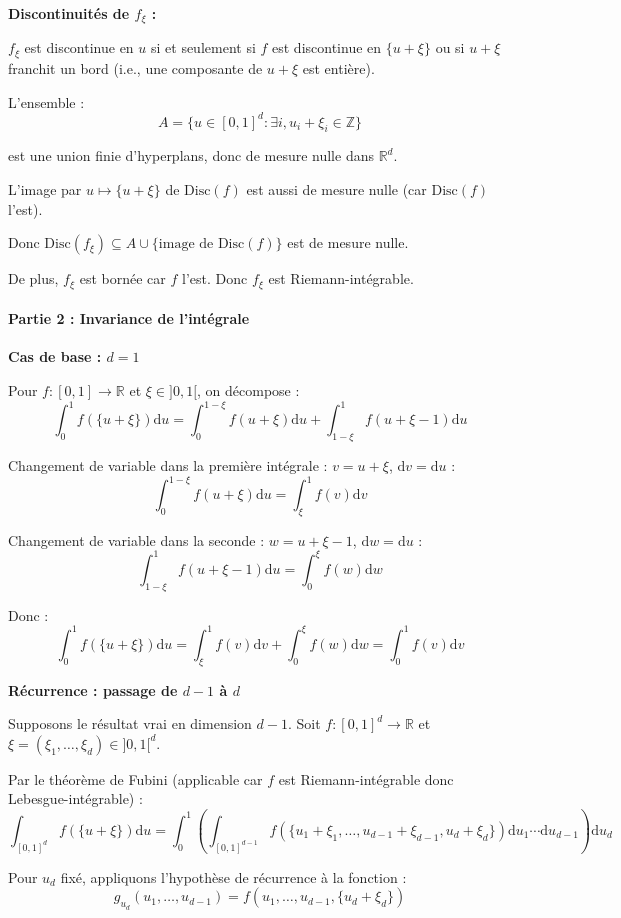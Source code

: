 \documentclass[12pt,a4paper]{article}
\theoremstyle{definition}
\theoremstyle{remark}
\newcommand{\R}{\mathbb{R}}
\newcommand{\dd}{\mathrm{d}}
\begin{document}
\textbf{Discontinuités de $f_\xi$ :}

$f_\xi$ est discontinue en $u$ si et seulement si $f$ est discontinue en $\{u + \xi\}$ ou si $u + \xi$ franchit un bord (i.e., une composante de $u + \xi$ est entière).

L'ensemble :
\[
A = \{u \in [0,1]^d : \exists i, u_i + \xi_i \in \mathbb{Z}\}
\]

est une union finie d'hyperplans, donc de mesure nulle dans $\R^d$.

L'image par $u \mapsto \{u + \xi\}$ de $\text{Disc}(f)$ est aussi de mesure nulle (car $\text{Disc}(f)$ l'est).

Donc $\text{Disc}(f_\xi) \subseteq A \cup \{\text{image de } \text{Disc}(f)\}$ est de mesure nulle.

De plus, $f_\xi$ est bornée car $f$ l'est. Donc $f_\xi$ est Riemann-intégrable.

\paragraph{Partie 2 : Invariance de l'intégrale}

\textbf{Cas de base : $d = 1$}

Pour $f : [0,1] \to \R$ et $\xi \in ]0,1[$, on décompose :
\[
\int_0^1 f(\{u + \xi\})\dd u = \int_0^{1-\xi} f(u + \xi)\dd u + \int_{1-\xi}^1 f(u + \xi - 1)\dd u
\]

Changement de variable dans la première intégrale : $v = u + \xi$, $\dd v = \dd u$ :
\[
\int_0^{1-\xi} f(u + \xi)\dd u = \int_\xi^1 f(v)\dd v
\]

Changement de variable dans la seconde : $w = u + \xi - 1$, $\dd w = \dd u$ :
\[
\int_{1-\xi}^1 f(u + \xi - 1)\dd u = \int_0^\xi f(w)\dd w
\]

Donc :
\[
\int_0^1 f(\{u + \xi\})\dd u = \int_\xi^1 f(v)\dd v + \int_0^\xi f(w)\dd w = \int_0^1 f(v)\dd v
\]

\textbf{Récurrence : passage de $d-1$ à $d$}

Supposons le résultat vrai en dimension $d-1$. Soit $f : [0,1]^d \to \R$ et $\xi = (\xi_1, \ldots, \xi_d) \in ]0,1[^d$.

Par le théorème de Fubini (applicable car $f$ est Riemann-intégrable donc Lebesgue-intégrable) :
\[
\int_{[0,1]^d} f(\{u + \xi\})\dd u = \int_0^1 \left(\int_{[0,1]^{d-1}} f(\{u_1 + \xi_1, \ldots, u_{d-1} + \xi_{d-1}, u_d + \xi_d\})\dd u_1 \cdots \dd u_{d-1}\right)\dd u_d
\]

Pour $u_d$ fixé, appliquons l'hypothèse de récurrence à la fonction :
\[
g_{u_d}(u_1, \ldots, u_{d-1}) = f(u_1, \ldots, u_{d-1}, \{u_d + \xi_d\})
\]
\end{document}
